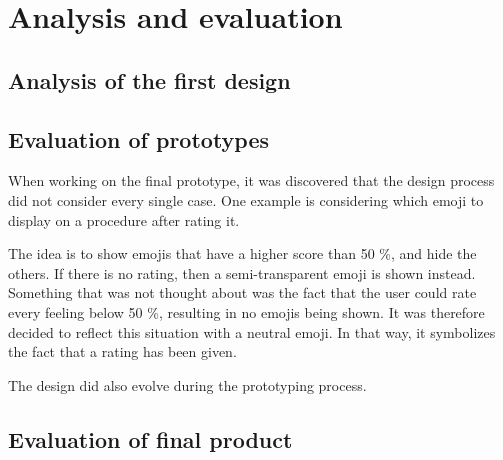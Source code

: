 \chapter{Analysis and evaluation}
\label{ch:analysis}

\section{Analysis of the first design}
\label{sec:eval-d1}



\section{Evaluation of prototypes}

When working on the final prototype, it was discovered that the design process did not consider every single case. One example is considering which emoji to display on a procedure after rating it.

The idea is to show emojis that have a higher score than 50 \%, and hide the others. If there is no rating, then a semi-transparent emoji is shown instead. Something that was not thought about was the fact that the user could rate every feeling below 50 \%, resulting in no emojis being shown. It was therefore decided to reflect this situation with a neutral emoji. In that way, it symbolizes the fact that a rating has been given.

The design did also evolve during the prototyping process.



\section{Evaluation of final product}
